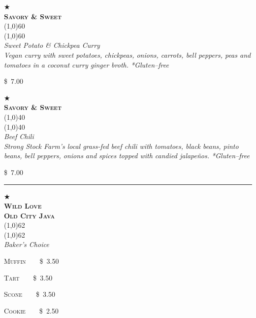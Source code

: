 \documentclass[letterpaper, 12pt]{article}%
\newcommand{\menuitem}[4]{
 \centering
  $\bigstar$\\
  \smallskip\vspace{0.1em}
  \textbf{\sffamily \textsc{\large#2}}\vspace{-1ex}\\
  \line(1,0){#1}\vspace{-2ex}\\
  \line(1,0){#1}\vspace{0.5ex}\\
  \smallskip
  \emph{\footnotesize#3}\\
  \vspace*{\fill}
  {\small#4}
}
\newcommand{\flowtherefore}{~~\raisebox{0.2ex}{$\therefore$}~~}
\newcommand{\price}[2]{
 \textsc{\small#1}\flowtherefore\$~\textsc{\small#2}
}
\newcommand{\varprice}[1]{
 \$~\textsc{\small#1}
}
\begin{document}
{\centering
\begin{minipage}{0.5\textwidth}
{\centering
\begin{minipage}[t][\ssminihi][b]{\ssminiwi}
 \centering
 \menuitem{60}{
  Savory \& Sweet}{
  \textup{\normalsize Sweet Potato \& Chickpea Curry}\\
  Vegan curry with sweet potatoes, chickpeas, onions, carrots, bell peppers, peas and tomatoes in a coconut curry ginger broth. *Gluten--free
  }{
  \varprice{7.00}
 }
\end{minipage}

\rule{0pt}{2em}

\begin{minipage}[t][\ssminihi][b]{\ssminiwi}
 \centering
 \menuitem{40}{
  Savory \& Sweet}{
  \textup{\normalsize Beef Chili}\\
  Strong Stock Farm's local grass-fed beef chili with tomatoes, black beans, pinto beans, bell peppers, onions and spices topped with candied jalape\~{n}os. *Gluten--free
  }{
  \varprice{7.00}
 }
\end{minipage}

}
\end{minipage}
\rule{2em}{0pt}
\begin{minipage}{0.3\textwidth}
{\centering
\begin{minipage}{\ssminihi}
 \menuitem{62}{Wild Love\\Old City Java}{
  \textup{\normalsize Baker's Choice}\vspace{1ex}
  }{
  \price{Muffin}{3.50}
  
  \price{Tart}{3.50}
  
  \price{Scone}{3.50}
  
  \price{Cookie}{2.50}
 }
\end{minipage}

}
\end{minipage}

}


\begin{minipage}{\textwidth}
\end{minipage}
\clearpage
\end{document}
